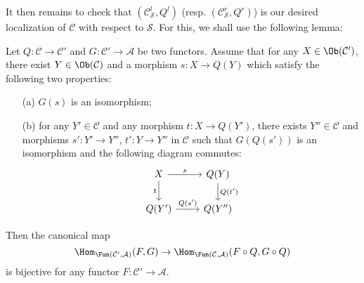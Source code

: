 It then remains to check that $(\mathcal{C}_\mathcal{S}^l,Q^l)$ (resp. $(\mathcal{C}_\mathcal{S}^r,Q^r)$) is our desired localization of $\mathcal{C}$ with respect to $\mathcal{S}$. For this, we shall use the following lemma:
\begin{lemma}\label{category localization faithful on functor lemma}
Let $Q:\mathcal{C}\to\mathcal{C}'$ and $G:\mathcal{C}'\to\mathcal{A}$ be two functors. Assume that for any $X\in\Ob(\mathcal{C}')$, there exist $Y\in\Ob(\mathcal{C})$ and a morphism $s:X\to Q(Y)$ which satisfy the following two properties:
\begin{enumerate}
    \item[(a)] $G(s)$ is an isomorphism;
    \item[(b)] for any $Y'\in\mathcal{C}$ and any morphism $t:X\to Q(Y')$, there exists $Y''\in\mathcal{C}$ and morphisms $s':Y'\to Y''$, $t':Y\to Y''$ in $\mathcal{C}$ such that $G(Q(s'))$ is an isomorphism and the following diagram commutes:
    \[\begin{tikzcd}
    X\ar[r,"s"]\ar[d,swap,"t"]&Q(Y)\ar[d,"Q(t')"]\\
    Q(Y')\ar[r,"Q(s')"]&Q(Y'')
    \end{tikzcd}\]
\end{enumerate}
Then the canonical map
\begin{equation}\label{category localization faithful on functor lemma-1}
\Hom_{\Fun(\mathcal{C}',\mathcal{A})}(F,G)\to\Hom_{\Fun(\mathcal{C},\mathcal{A})}(F\circ Q,G\circ Q)
\end{equation}
is bijective for any functor $F:\mathcal{C}'\to\mathcal{A}$.
\end{lemma}
